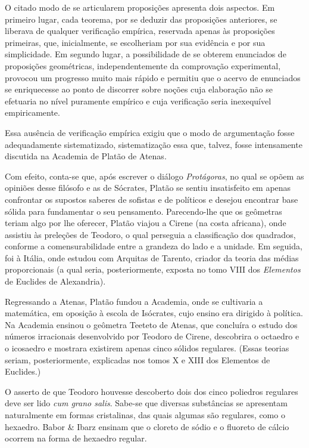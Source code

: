 \documentclass{hipatia}
\begin{document}
O citado modo de se articularem proposições apresenta dois aspectos. Em primeiro lugar, cada teorema, por se deduzir das proposições anteriores, se liberava de qualquer verificação empírica, reservada apenas às proposições primeiras, que, inicialmente, se escolheriam por sua evidência e por sua simplicidade. Em segundo lugar, a possibilidade de se obterem enunciados de proposições geométricas, independentemente da comprovação experimental, provocou um progresso muito mais rápido e permitiu que o acervo de enunciados se enriquecesse ao ponto de discorrer sobre noções cuja elaboração não se efetuaria no nível puramente empírico e cuja verificação seria inexequível empiricamente.  \cite[p. 120]{kagan1986}\cite[p. 12]{smogorzhevski1976}  

Essa ausência de verificação empírica exigiu que o modo de argumentação fosse adequadamente sistematizado, sistematização essa que, talvez, fosse intensamente discutida na Academia de Platão de Atenas.

Com efeito, conta-se que, após escrever o diálogo \emph{Protágoras}, no qual se opõem as opiniões desse filósofo e as de Sócrates, Platão se sentiu insatisfeito em apenas confrontar os supostos saberes de sofistas e de políticos e desejou encontrar base sólida para fundamentar o seu pensamento. Parecendo-lhe que os geômetras teriam algo por lhe oferecer, Platão viajou a Cirene (na costa africana), onde assistiu às preleções de Teodoro, o qual perseguia a classificação dos quadrados, conforme a comensurabilidade entre a grandeza do lado e a unidade. Em seguida, foi à Itália, onde estudou com Arquitas de Tarento, criador da teoria das médias proporcionais (a qual seria, posteriormente, exposta no tomo VIII dos \emph{Elementos} de Euclides de Alexandria).  \cite[p. 103]{laercio1988}\cite[p. 170, 182]{mosterin1984}\cite[p. 209]{russell1945} 

Regressando a Atenas, Platão fundou a Academia, onde se cultivaria a matemática, em oposição à escola de Isócrates, cujo ensino era dirigido à política. Na Academia ensinou o geômetra Teeteto de Atenas, que concluíra o estudo dos números irracionais desenvolvido por Teodoro de Cirene, descobrira o octaedro e o icosaedro e mostrara existirem apenas cinco sólidos regulares. (Essas teorias seriam, posteriormente, explicadas nos tomos X e XIII dos Elementos de Euclides.)  \cite[ p. 64]{aaboe1984}\cite[p. 172, 188]{mosterin1984}\cite[p. 147]{russell1945}

O asserto de que Teodoro houvesse descoberto dois dos cinco poliedros regulares deve ser lido \emph{cum grano salis}. Sabe-se que diversas substâncias se apresentam naturalmente em formas cristalinas, das quais algumas são regulares, como o hexaedro. Babor \& Ibarz ensinam que o cloreto de sódio e o fluoreto de cálcio ocorrem na forma de hexaedro regular. \cite[p. 84]{babor1960}
\end{document}
